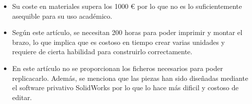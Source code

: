 \begin{itemize}
\begin{itemize}
        \item Su coste en materiales supera los 1000 \euro \xspace por lo que no es lo suficientemente asequible para su uso académico.
        \item Según este artículo, se necesitan 200 horas para poder imprimir y montar el brazo, lo que implica que es costoso en tiempo 
        crear varias unidades y requiere de cierta habilidad para construirlo correctamente.
        \item En este artículo no se proporcionan los ficheros necesarios para poder replicacarlo. Además, se menciona que las piezas han sido 
        diseñadas mediante el software privativo SolidWorks\textsuperscript{\tiny\textregistered} por lo que lo hace más dificil y costoso de editar.
    \end{itemize}\
\end{itemize}\
\vspace{1cm}
